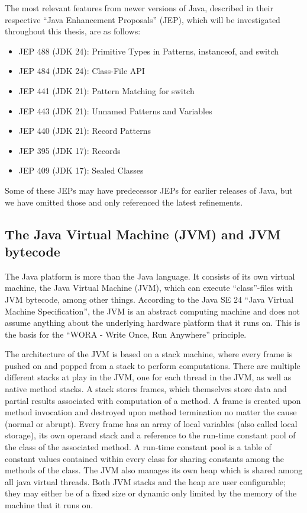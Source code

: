 The most relevant features from newer versions of Java, described in their respective ``Java Enhancement Proposals'' (JEP),
which will be investigated throughout this thesis, are as follows:

\begin{itemize}
    \item JEP 488 (JDK 24): Primitive Types in Patterns, instanceof, and switch
    \item JEP 484 (JDK 24): Class-File API
    \item JEP 441 (JDK 21): Pattern Matching for switch
    \item JEP 443 (JDK 21): Unnamed Patterns and Variables
    \item JEP 440 (JDK 21): Record Patterns
    \item JEP 395 (JDK 17): Records
    \item JEP 409 (JDK 17): Sealed Classes
\end{itemize}

Some of these JEPs may have predecessor JEPs for earlier releases of Java, but we have omitted those and only referenced the latest refinements. 

\subsection{The Java Virtual Machine (JVM) and JVM bytecode}

The Java platform is more than the Java language. It consists of its own virtual machine,
the Java Virtual Machine (JVM), which can execute ``class''-files with JVM bytecode, among other things.
According to the Java SE 24 ``Java Virtual Machine Specification'', the JVM is an abstract computing machine
and does not assume anything about the underlying hardware platform that it runs on. This is the basis for the
``WORA - Write Once, Run Anywhere'' principle.

The architecture of the JVM is based on a stack machine, where every frame is pushed on and popped from
a stack to perform computations. There are multiple different stacks at play in the JVM, one for each
thread in the JVM, as well as native method stacks. A stack stores frames, which themselves store data
and partial results associated with computation of a method. A frame is created upon method invocation
and destroyed upon method termination no matter the cause (normal or abrupt). Every frame has an array
of local variables (also called local storage), its own operand stack and a reference to the run-time
constant pool of the class of the associated method. A run-time constant pool is a table of constant
values contained within every class for sharing constants among the methods of the class. The JVM
also manages its own heap which is shared among all java virtual threads. Both JVM stacks and the heap
are user configurable; they may either be of a fixed size or dynamic only limited by the memory of
the machine that it runs on.

